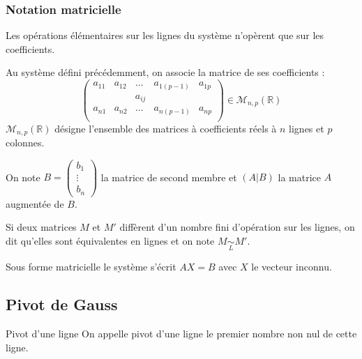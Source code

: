 {\subsubsection{Notation matricielle}
\begin{remarque}
Les opérations élémentaires sur les lignes du système n'opèrent que sur les coefficients. 
\end{remarque}

\begin{defi}{}
Au système défini précédemment, on associe la matrice de ses coefficients :
$$
\begin{pmatrix}
a_{11} & a_{12} & \ldots & a_{1(p-1)} & a_{1p} \\
 & & a_{ij} & & \\
a_{n1} & a_{n2} & \ldots & a_{n(p-1)} & a_{np} \\
\end{pmatrix} \in \mathcal{M}_{n,p}(\mathbb{R})
$$
$\mathcal{M}_{n,p}(\mathbb{R})$ désigne l'ensemble des matrices à coefficients réels à $n$ lignes et $p$ colonnes. 
\end{defi}

\begin{defi}{}
On note $B=\begin{pmatrix} b_1 \\ \vdots \\ b_n \end{pmatrix}$ la matrice de second membre et $(A|B)$ la matrice $A$ augmentée de $B$. 
\end{defi}


\begin{defi}{}
Si deux matrices $M$ et $M'$ diffèrent d'un nombre fini d'opération sur les lignes, on dit qu'elles sont équivalentes en lignes et on note $M \underset{L}{\sim} M'$. 
\end{defi}

\begin{remarque}
Sous forme matricielle le système s'écrit $AX=B$ avec $X$ le vecteur inconnu. 
\end{remarque}


\subsection{Pivot de Gauss}
\begin{defi}{Pivot d'une ligne}
On appelle pivot d'une ligne le premier nombre non nul de cette ligne. 
\end{defi}

}
